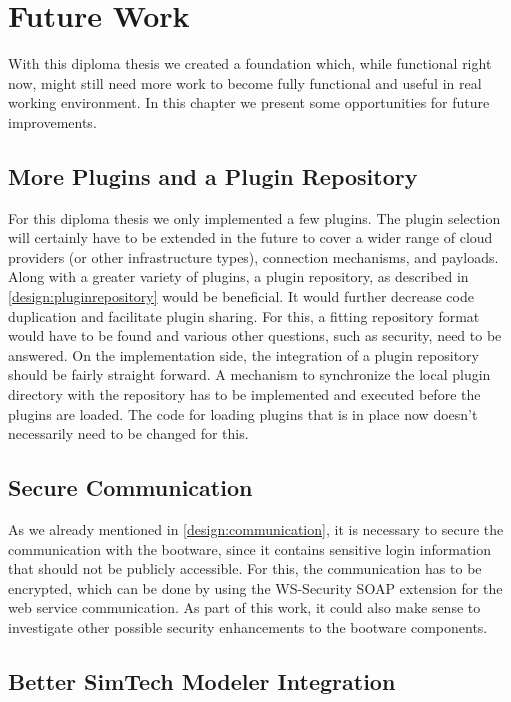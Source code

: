 \chapter{Future Work}

With this diploma thesis we created a foundation which, while functional right now, might still need more work to become fully functional and useful in real working environment.
In this chapter we present some opportunities for future improvements.

\section{More Plugins and a Plugin Repository}

For this diploma thesis we only implemented a few plugins.
The plugin selection will certainly have to be extended in the future to cover a wider range of cloud providers (or other infrastructure types), connection mechanisms, and payloads.
Along with a greater variety of plugins, a plugin repository, as described in \autoref{design:pluginrepository} would be beneficial.
It would further decrease code duplication and facilitate plugin sharing.
For this, a fitting repository format would have to be found and various other questions, such as security, need to be answered.
On the implementation side, the integration of a plugin repository should be fairly straight forward.
A mechanism to synchronize the local plugin directory with the repository has to be implemented and executed before the plugins are loaded.
The code for loading plugins that is in place now doesn't necessarily need to be changed for this.

\section{Secure Communication}

As we already mentioned in \autoref{design:communication}, it is necessary to secure the communication with the bootware, since it contains sensitive login information that should not be publicly accessible.
For this, the communication has to be encrypted, which can be done by using the WS-Security SOAP extension for the web service communication.
As part of this work, it could also make sense to investigate other possible security enhancements to the bootware components.

\section{Better SimTech Modeler Integration}


